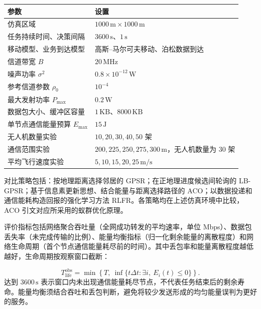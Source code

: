 \begin{table}[!htbp]
\centering\small
{}
\label{rq1:tab:settings}
\begin{tabularx}{\textwidth}{lX}
\toprule
参数 & 设置 \\
\midrule
仿真区域 & $1000\,\mathrm{m}\times1000\,\mathrm{m}$ \\
任务持续时间、决策间隔 & $3600\,\mathrm{s}$、$1\,\mathrm{s}$ \\
移动模型、业务到达模型 & 高斯--马尔可夫移动、泊松数据到达 \\
信道带宽 $B$ & $20\,\mathrm{MHz}$ \\
噪声功率 $\sigma^2$ & $0.8\times10^{-12}\,\mathrm{W}$ \\
参考信道参数 $\rho_0$ & $10^{-4}$ \\
最大发射功率 $P_{\max}$ & $0.2\,\mathrm{W}$ \\
数据包大小、缓冲区容量 & $1\,\mathrm{KB}$、$8000\,\mathrm{KB}$ \\
单节点通信能量预算 $E_{\max}$ & $15\,\mathrm{J}$ \\
无人机数量实验 & $10,20,30,40,50$ 架 \\
通信范围实验 & $200,225,250,275,300\,\mathrm{m}$，无人机数量为 30 架 \\
平均飞行速度实验 & $5,10,15,20,25\,\mathrm{m/s}$ \\
\bottomrule
\end{tabularx}
\end{table}

对比策略包括：按地理距离选择邻居的 GPSR\cite{gpsr}；在正地理进度候选间轮询的 LB-GPSR；基于信息素更新思想\cite{aco}、结合能量与距离选择路径的 ACO；以数据投递和通信能耗构造回报的强化学习方法 RLFR\cite{drlfr}。各策略均在上述仿真环境中比较，ACO 引文对应所采用的蚁群优化原理。

评价指标包括网络聚合吞吐量（全网成功转发的平均速率，单位 Mbps）、数据包丢失率（未完成传输的比例）、能量均衡指标（归一化剩余能量的离散程度）和网络生命周期（首个节点通信能量耗尽前的时间）。其中丢包率和能量离散程度越低越好，生命周期按观察窗口截断：

\begin{equation}
 T_{\mathrm{life}}^{\mathrm{obs}}=
 \min\!\left\{T,\ \inf\{t\Delta t:\exists i,\ E_i(t)\le0\}\right\}.
 \label{rq1:eq:observed_lifetime}
\end{equation}
达到 $3600\,\mathrm{s}$ 表示窗口内未出现通信能量耗尽节点，不代表任务结束后的剩余寿命。能量均衡须结合吞吐和丢包判断，避免将较少发送形成的均匀能量误判为更好的服务。

